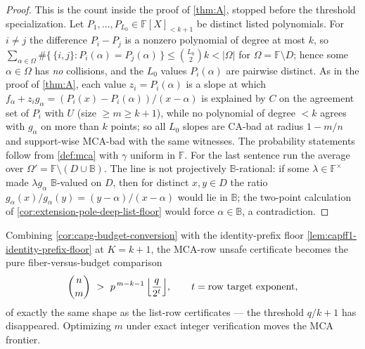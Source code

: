 \documentclass[11pt]{article}
\theoremstyle{definition}
\theoremstyle{remark}
\newcommand{\F}{\mathbb{F}}
\newcommand{\B}{\mathbb{B}}
\begin{document}
\begin{proof}
This is the count inside the proof of \cref{thm:A}, stopped before the
threshold specialization.  Let $P_1,\dots,P_{L_0}\in\F[X]_{<k+1}$ be
distinct listed polynomials.  For $i\ne j$ the difference $P_i-P_j$ is a
nonzero polynomial of degree at most $k$, so
$\sum_{\alpha\in\Omega}\#\{\,\{i,j\}:P_i(\alpha)=P_j(\alpha)\,\}
\le\binom{L_0}2k<|\Omega|$ for $\Omega=\F\setminus D$; hence some
$\alpha\in\Omega$ has \emph{no} collisions, and the $L_0$ values
$P_i(\alpha)$ are pairwise distinct.  As in the proof of \cref{thm:A},
each value $z_i=P_i(\alpha)$ is a slope at which
$f_\alpha+z_ig_\alpha=(P_i(x)-P_i(\alpha))/(x-\alpha)$ is explained by
$C$ on the agreement set of $P_i$ with $U$ (size $\ge m\ge k+1$), while no
polynomial of degree $<k$ agrees with $g_\alpha$ on more than $k$ points;
so all $L_0$ slopes are CA-bad at radius $1-m/n$ and support-wise MCA-bad
with the same witnesses.  The probability statements follow from
\cref{def:mca} with $\gamma$ uniform in $\F$.  For the last sentence run the average over
$\Omega'=\F\setminus(D\cup\B)$.  The line is not projectively $\B$-rational:
if some $\lambda\in\F^\times$ made $\lambda g_\alpha$ $\B$-valued on $D$,
then for distinct $x,y\in D$ the ratio
$g_\alpha(x)/g_\alpha(y)=(y-\alpha)/(x-\alpha)$ would lie in $\B$; the
two-point calculation of \cref{cor:extension-pole-deep-list-floor} would force
$\alpha\in\B$, a contradiction.
\end{proof}

Combining \cref{cor:capg-budget-conversion} with the identity-prefix floor
\cref{lem:capff1-identity-prefix-floor} at $K=k+1$, the MCA-row unsafe
certificate becomes the pure fiber-versus-budget comparison
\[
        \binom nm\ >\ p^{\,m-k-1}\,\Bigl\lfloor\frac{q}{2^{t}}\Bigr\rfloor ,
        \qquad t=\text{row target exponent},
\]
of exactly the same shape as the list-row certificates --- the threshold
$q/k+1$ has disappeared.  Optimizing $m$ under exact integer verification
moves the MCA frontier.
\end{document}
